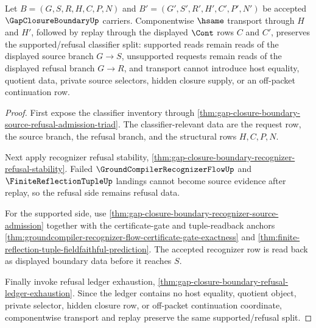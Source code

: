 \begin{theorem}
\label{thm:gap-closure-boundary-refusal-classifier-stability}
Let $B=(G,S,R,H,C,P,N)$ and $B'=(G',S',R',H',C',P',N')$ be accepted $\GapClosureBoundaryUp$ carriers. Componentwise $\hsame$ transport through $H$ and $H'$, followed by replay through the displayed $\Cont$ rows $C$ and $C'$, preserves the supported/refusal classifier split: supported reads remain reads of the displayed source branch $G \longrightarrow S$, unsupported requests remain reads of the displayed refusal branch $G \longrightarrow R$, and transport cannot introduce host equality, quotient data, private source selectors, hidden closure supply, or an off-packet continuation row.
\end{theorem}
\begin{proof}
First expose the classifier inventory through \autoref{thm:gap-closure-boundary-source-refusal-admission-triad}. The classifier-relevant data are the request row, the source branch, the refusal branch, and the structural rows $H,C,P,N$.

Next apply recognizer refusal stability, \autoref{thm:gap-closure-boundary-recognizer-refusal-stability}. Failed $\GroundCompilerRecognizerFlowUp$ and $\FiniteReflectionTupleUp$ landings cannot become source evidence after replay, so the refusal side remains refusal data.

For the supported side, use \autoref{thm:gap-closure-boundary-recognizer-source-admission} together with the certificate-gate and tuple-readback anchors \autoref{thm:groundcompiler-recognizer-flow-certificate-gate-exactness} and \autoref{thm:finite-reflection-tuple-fieldfaithful-prediction}. The accepted recognizer row is read back as displayed boundary data before it reaches $S$.

Finally invoke refusal ledger exhaustion, \autoref{thm:gap-closure-boundary-refusal-ledger-exhaustion}. Since the ledger contains no host equality, quotient object, private selector, hidden closure row, or off-packet continuation coordinate, componentwise transport and replay preserve the same supported/refusal split.
\end{proof}

